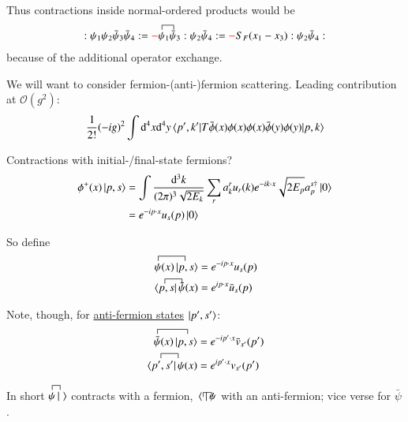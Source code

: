 Thus contractions inside normal-ordered products would be
\begin{align*}
	:\psi_1 \psi_2 \bar{\psi}_3 \bar{\psi}_4:= \textcolor{red}{-} \contraction{}{\psi}{_1}{\bar{\psi}}\psi_1\bar{\psi}_3 :\psi_2 \bar{\psi}_4: = \textcolor{red}{-} S_F(x_1 - x_3) :\psi_2 \bar{\psi}_4:
\end{align*}
because of the additional operator exchange.

We will want to consider fermion-(anti-)fermion scattering. Leading contribution at $\mathcal{O}(g^2)$:
\begin{align*}
	\frac{1}{2!} (-ig)^2 \int \dd^4 x \dd^4 y \braket{p', k' |T\bar{\phi}(x) \phi(x) \phi(x) \bar{\phi}(y)\phi(y)|p,k}
\end{align*}

Contractions with initial-/final-state fermions?
\begin{align*}
	\phi^+(x) \ket{p,s} &= \int \frac{\dd^3 k}{(2\pi)^3 \sqrt{2E_k}} \sum_r a^r_k u_r(k) e^{-ik\cdot x} \sqrt{2E_p} a^{s\dagger}_p \ket{0} \\
						&= e^{-ip\cdot x} u_s(p) \ket{0}	
\end{align*}

So define
\begin{align}
	\begin{split}
	\contraction{}{\psi}{(x)|}{p,s} \psi(x) \ket{p,s} &=  e^{-ip\cdot x} u_s(p) \\
	\contraction{\langle}{p,s}{|\;}{\bar\psi} \bra{p,s}\bar\psi(x)  &=  e^{ip\cdot x} \bar{u}_s(p)
	\end{split}
\end{align}

Note, though, for \underline{anti-fermion states} $\ket{p', s'}$:
\begin{align}
	\begin{split}
	\contraction{}{\bar{\psi}}{(x)|}{p',s'} \bar{\psi}(x) \ket{p,s} &=  e^{-ip' \cdot x} \bar{v}_{s'}(p') \\
	\contraction{\langle}{p',s'}{|}{\psi} \bra{p',s'}\psi(x)  &=  e^{ip'\cdot x} v_{s'}(p')
	\end{split}
\end{align}

In short $\contraction{}{\psi}{|}{\;} \psi \ket{\;} $ contracts with a fermion, $\contraction{\langle}{\,\;}{|}{\psi} \bra{\;}\psi$ with an anti-fermion; vice verse for $\bar{\psi}$.

